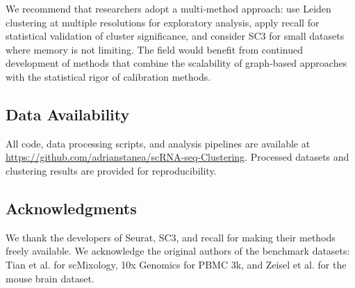 We recommend that researchers adopt a multi-method approach: use Leiden clustering at multiple resolutions for exploratory analysis, apply recall for statistical validation of cluster significance, and consider SC3 for small datasets where memory is not limiting. The field would benefit from continued development of methods that combine the scalability of graph-based approaches with the statistical rigor of calibration methods.

\subsection*{Data Availability}

All code, data processing scripts, and analysis pipelines are available at \url{https://github.com/adrianstanea/scRNA-seq-Clustering}. Processed datasets and clustering results are provided for reproducibility.

\subsection*{Acknowledgments}

We thank the developers of Seurat, SC3, and recall for making their methods freely available. We acknowledge the original authors of the benchmark datasets: Tian et al. for scMixology, 10x Genomics for PBMC 3k, and Zeisel et al. for the mouse brain dataset.
